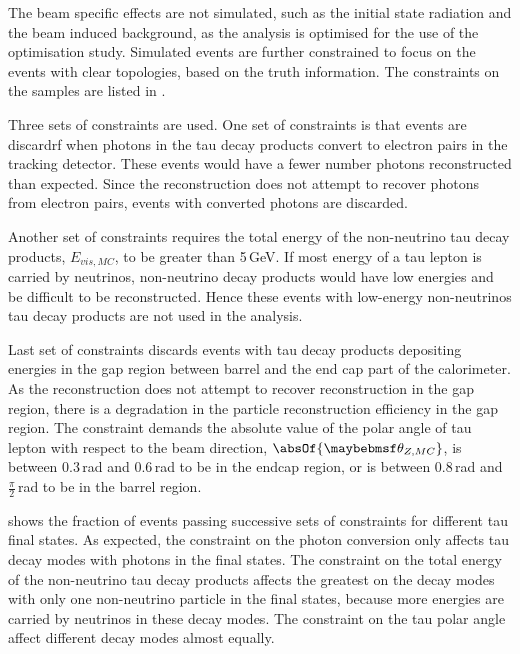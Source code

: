 The beam specific effects are not simulated, such as the initial state radiation and the beam induced background, as the analysis is optimised for the use of the \ECAL optimisation study. Simulated events are further constrained to focus on the events with clear topologies, based on the truth information. The constraints on the samples are listed in .

Three sets of constraints are used. One set of constraints is that events are discardrf when photons in the tau decay products convert to electron pairs in the tracking detector. These events would have a fewer number photons reconstructed than expected. Since the reconstruction does not attempt to recover photons from electron pairs, events with converted photons are discarded.


Another set of constraints requires the total energy of the non-neutrino tau decay products, $E_{vis,MC}$, to be greater than 5\,GeV. If most energy of a tau lepton is carried by  neutrinos, non-neutrino decay products would have low energies and be difficult to be reconstructed. Hence these events with low-energy non-neutrinos tau decay products are not used in the analysis.



Last set of constraints discards events with tau decay products depositing energies in the gap region between barrel and the end cap part of the calorimeter. As the reconstruction   does not attempt to recover reconstruction in the gap region, there is a degradation in the particle reconstruction efficiency in the gap region. The constraint demands the absolute value of the polar angle of tau lepton with respect to the beam direction, $\absOf{\theta_{Z,MC}}$, is between 0.3\,rad and 0.6\,rad to be  in the endcap region, or is between 0.8\,rad and $\frac{\pi}{2}$\,rad to be  in the barrel region.

 shows the fraction of events passing successive sets of constraints  for different tau final states.  As expected, the constraint on the photon conversion only affects tau decay modes with  photons in the final states. The constraint on the total energy of the non-neutrino tau decay products affects the greatest on the  decay modes with only one non-neutrino particle in the final states, because more energies are carried by neutrinos in these decay modes. The constraint on the tau polar angle affect different decay modes almost equally.

